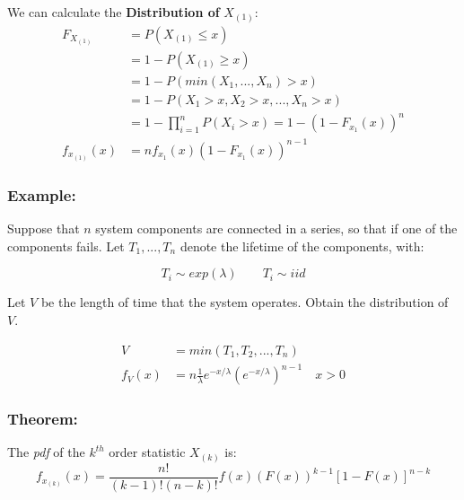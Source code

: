 \documentclass{article}
\begin{document}
We can calculate the \textbf{Distribution of} $X_{(1)}$:
\begin{equation*}
    \begin{split}
        F_{X_{(1)}} &= P\left(X_{(1)} \leq x \right)\\
                    &= 1- P\left(X_{(1)} \geq x \right)\\
                    &= 1- P\left( min(X_1,...,X_n) > x \right)\\
                    &= 1- P\left( X_1 > x, X_2 > x,...,X_n > x\right)\\
                    &= 1 - \prod_{i=1}^n P(X_i > x) = 1 - \left(1 - F_{x_1}(x) \right)^n\\
        f_{x_{(1)}}(x) &= n  f_{x_1}(x) \left(1 - F_{x_1}(x) \right)^{n-1}
    \end{split}
\end{equation*}

\subsubsection*{Example:}

Suppose that $n$ system components are connected in a series, so that if one of the components fails. Let $T_1,...,T_n$ denote the lifetime of the components, with:

\begin{equation*}
    T_i \sim exp(\lambda) \quad \quad T_i \sim iid
\end{equation*}

Let $V$ be the length of time that the system operates. Obtain the distribution of $V$.

\begin{equation*}
    \begin{split}
        V &= min(T_1,T_2,...,T_n)\\
        f_V(x) &= n \frac{1}{\lambda} e^{-x/\lambda} \left(e^{-x/\lambda} \right)^{n-1} \quad x > 0
    \end{split}
\end{equation*}


\subsubsection*{Theorem:}
The \textit{pdf} of the $k^{th}$ order statistic $X_{(k)}$ is:
\begin{equation*}
    f_{x_{(k)}} (x) = \frac{n!}{(k-1)!(n-k)!} f(x) \left(F(x)\right)^{k-1} \left[ 1 - F(x) \right]^{n-k}
\end{equation*}
\end{document}
